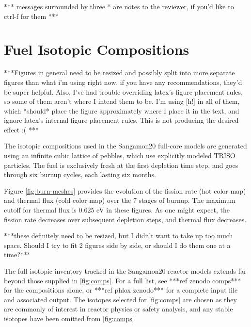 *** messages surrounded by three * are notes to the reviewer, if you'd like to ctrl-f for them ***

\section{Fuel Isotopic Compositions}

***Figures in general need to be resized and possibly split into more separate figures than what i'm using right now.  if you have any recommendations, they'd be super helpful.  Also, I've had trouble overriding latex's figure placement rules, so some of them aren't where I intend them to be.  I'm using [h!] in all of them, which *should* place the figure approximately where I place it in the text, and ignore latex's internal figure placement rules.  This is not producing the desired effect :( ***



The isotopic compositions used in the Sangamon20 full-core models are generated using an infinite cubic lattice of pebbles, which use explicitly modeled TRISO particles.  The fuel is exclusively fresh at the first depletion time step, and goes through six burnup cycles, each lasting six months.

Figure \ref{fig:burn-meshes} provides the evolution of the fission rate (hot color map) and thermal flux (cold color map) over the 7 stages of burnup.  The maximum cutoff for thermal flux is 0.625 eV in these figures.  As one might expect, the fission rate decreases over subsequent depletion steps, and thermal flux decreases.


***these definitely need to be resized, but I didn't want to take up too much space.  Should I try to fit 2 figures side by side, or should I do them one at a time?***

The full isotopic inventory tracked in the Sangamon20 reactor models extends far beyond those supplied in \ref{fig:comps}.  For a full list, see ***ref zenodo comps*** for the compositions alone, or ***ref phlox zenodo*** for a complete input file and associated output.  The isotopes selected for \ref{fig:comps} are chosen as they are commonly of interest in reactor physics or safety analysis, and any stable isotopes have been omitted from \ref{fig:comps}.


